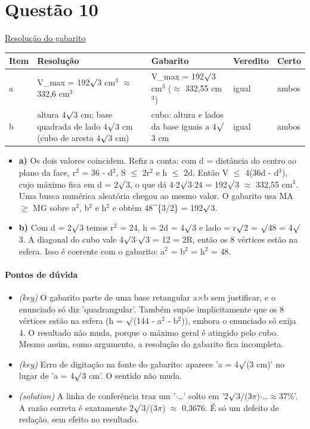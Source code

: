 \documentclass{article}%
\begin{document}
\section*{Questão 10}%
\href{https://poliedroresolve.sistemapoliedro.com.br/vestibulares/ime/2027/ime-2-fase-dia-1-26-10-2026-2-fase-dia-1/dissertativa-10-matematica-2-fase-dia-1-ime-2027}{Resolução do gabarito}\par\smallskip%
\begin{longtable}{@{}p{} p{} p{} p{} p{}@{}}\toprule Item & Resolução & Gabarito & Veredito & Certo \\ \midrule
a & V\_max = 192$\surd$3 cm$^3$ $\approx$ 332,6 cm$^3$ & V\_max = 192$\surd$3 cm$^3$ ($\approx$ 332,55 cm$^3$) & igual & ambos \\
b & altura 4$\surd$3 cm; base quadrada de lado 4$\surd$3 cm (cubo de aresta 4$\surd$3 cm) & cubo: altura e lados da base iguais a 4$\surd$3 cm & igual & ambos \\
\bottomrule\end{longtable}%
\begin{itemize}%
\item%
\textbf{a)} Os dois valores coincidem. Refiz a conta: com d = distância do centro ao plano da face, r$^2$ = 36 - d$^2$, S $\leq$ 2r$^2$ e h $\leq$ 2d. Então V $\leq$ 4(36d - d$^3$), cujo máximo fica em d = 2$\surd$3, o que dá 4$\cdot$2$\surd$3$\cdot$24 = 192$\surd$3 $\approx$ 332,55 cm$^3$. Uma busca numérica aleatória chegou ao mesmo valor. O gabarito usa MA $\geq$ MG sobre a$^2$, b$^2$ e h$^2$ e obtém 48\^{}\{3/2\} = 192$\surd$3.%
\item%
\textbf{b)} Com d = 2$\surd$3 temos r$^2$ = 24, h = 2d = 4$\surd$3 e lado = r$\surd$2 = $\surd$48 = 4$\surd$3. A diagonal do cubo vale 4$\surd$3$\cdot$$\surd$3 = 12 = 2R, então os 8 vértices estão na esfera. Isso é coerente com o gabarito: a$^2$ = b$^2$ = h$^2$ = 48.%
\end{itemize}%
\paragraph{Pontos de dúvida}%
\begin{itemize}%
\item%
\textit{(key)} O gabarito parte de uma base retangular a$\times$b sem justificar, e o enunciado só diz 'quadrangular'. Também supõe implicitamente que os 8 vértices estão na esfera (h = $\surd$(144 - a$^2$ - b$^2$)), embora o enunciado só exija 4. O resultado não muda, porque o máximo geral é atingido pelo cubo. Mesmo assim, como argumento, a resolução do gabarito fica incompleta.%
\item%
\textit{(key)} Erro de digitação na fonte do gabarito: aparece 'a = 4$\surd$(3 cm)' no lugar de 'a = 4$\surd$3 cm'. O sentido não muda.%
\item%
\textit{(solution)} A linha de conferência traz um '$\cdot$\ldots{}' solto em '2$\surd$3/(3$\pi$)$\cdot$\ldots{}$\approx$37\%'. A razão correta é exatamente 2$\surd$3/(3$\pi$) $\approx$ 0,3676. É só um defeito de redação, sem efeito no resultado.%
\end{itemize}%
\end{document}
